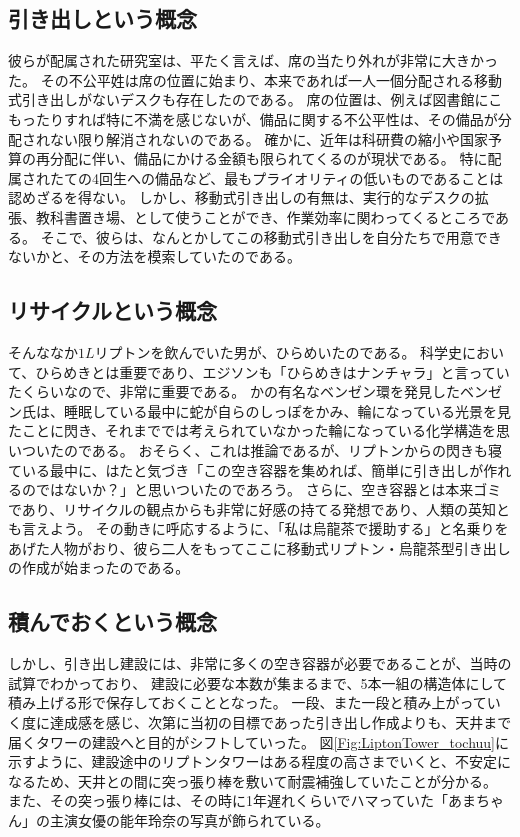 \subsection{引き出しという概念}
彼らが配属された研究室は、平たく言えば、席の当たり外れが非常に大きかった。
その不公平姓は席の位置に始まり、本来であれば一人一個分配される移動式引き出しがないデスクも存在したのである。
席の位置は、例えば図書館にこもったりすれば特に不満を感じないが、備品に関する不公平性は、その備品が分配されない限り解消されないのである。
確かに、近年は科研費の縮小や国家予算の再分配に伴い、備品にかける金額も限られてくるのが現状である。
特に配属されたての4回生への備品など、最もプライオリティの低いものであることは認めざるを得ない。
しかし、移動式引き出しの有無は、実行的なデスクの拡張、教科書置き場、として使うことができ、作業効率に関わってくるところである。
そこで、彼らは、なんとかしてこの移動式引き出しを自分たちで用意できないかと、その方法を模索していたのである。

\subsection{リサイクルという概念}
そんななか$1L$リプトンを飲んでいた男が、ひらめいたのである。
科学史において、ひらめきとは重要であり、エジソンも「ひらめきはナンチャラ」と言っていたくらいなので、非常に重要である。
かの有名なベンゼン環を発見したベンゼン氏は、睡眠している最中に蛇が自らのしっぽをかみ、輪になっている光景を見たことに閃き、それまででは考えられていなかった輪になっている化学構造を思いついたのである。
おそらく、これは推論であるが、リプトンからの閃きも寝ている最中に、はたと気づき「この空き容器を集めれば、簡単に引き出しが作れるのではないか？」と思いついたのであろう。
さらに、空き容器とは本来ゴミであり、リサイクルの観点からも非常に好感の持てる発想であり、人類の英知とも言えよう。
その動きに呼応するように、「私は烏龍茶で援助する」と名乗りをあげた人物がおり、彼ら二人をもってここに移動式リプトン・烏龍茶型引き出しの作成が始まったのである。

\subsection{積んでおくという概念}
しかし、引き出し建設には、非常に多くの空き容器が必要であることが、当時の試算でわかっており、
建設に必要な本数が集まるまで、5本一組の構造体にして積み上げる形で保存しておくこととなった。
一段、また一段と積み上がっていく度に達成感を感じ、次第に当初の目標であった引き出し作成よりも、天井まで届くタワーの建設へと目的がシフトしていった。
図\ref{Fig:LiptonTower_tochuu}に示すように、建設途中のリプトンタワーはある程度の高さまでいくと、不安定になるため、天井との間に突っ張り棒を敷いて耐震補強していたことが分かる。
また、その突っ張り棒には、その時に1年遅れくらいでハマっていた「あまちゃん」の主演女優の能年玲奈の写真が飾られている。

